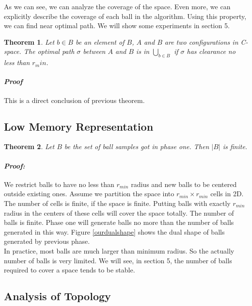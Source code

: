 \documentclass[11pt]{article}
\newtheorem{theorem}{Theorem}[section]
\begin{document}
  As we can see, we can analyze the coverage of the space. Even more, we can explicitly describe the coverage of each ball in the algorithm. Using this property, we can find near optimal path. We will show some experiments in section 5.
  
  \begin{theorem}
  Let $b \in B$ be an element of $B$, $A$ and $B$ are two configurations in \emph{C-space}. The optimal path $\sigma$ between $A$ and $B$ is in $\bigcup_{b\in B}$ if $\sigma$ has clearance no less than $r_min$. 
  \end{theorem}   
  \paragraph{\emph{Proof}}
  \indent This is a direct conclusion of previous theorem.

  \subsection{Low Memory Representation}  
  \begin{theorem}
  Let $B$ be the set of ball samples got in phase one. Then $|B|$ is finite.   
  \end{theorem}
  \paragraph{\emph{Proof:}} 
  \indent We restrict balls to have no less than $r_{min}$ radius and new balls to be centered outside existing ones. Assume we partition the space into $r_{min} \times r_{min}$ cells in 2D. The number of cells is finite, if the space is finite. Putting balls with exactly $r_{min}$ radius in the centers of these cells will cover the space totally. The number of balls is finite. Phase one will generate balls no more than the number of balls generated in this way. Figure \ref{ourdualshape} shows the dual shape of balls generated by previous phase.  \\
  
  In practice, most balls are much larger than minimum radius. So the actually number of balls is very limited. We will see, in section 5, the number of balls required to cover a space tends to be stable. 
  
  \subsection{Analysis of Topology}
  
\end{document}
